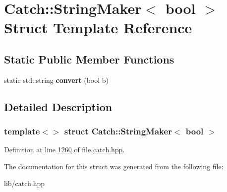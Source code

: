 \hypertarget{structCatch_1_1StringMaker_3_01bool_01_4}{}\section{Catch\+::String\+Maker$<$ bool $>$ Struct Template Reference}
\label{structCatch_1_1StringMaker_3_01bool_01_4}
\subsection*{Static Public Member Functions}
\begin{DoxyCompactItemize}
\item 
\mbox{\label{structCatch_1_1StringMaker_3_01bool_01_4_a37e9899c82c4b4515f876f16f8957a77}} 
static std\+::string {\bfseries convert} (bool b)
\end{DoxyCompactItemize}


\subsection{Detailed Description}
\subsubsection*{template$<$$>$\newline
struct Catch\+::\+String\+Maker$<$ bool $>$}



Definition at line \mbox{\hyperlink{catch_8hpp_source_l01260}{1260}} of file \mbox{\hyperlink{catch_8hpp_source}{catch.\+hpp}}.



The documentation for this struct was generated from the following file\+:\begin{DoxyCompactItemize}
\item 
lib/catch.\+hpp\end{DoxyCompactItemize}
